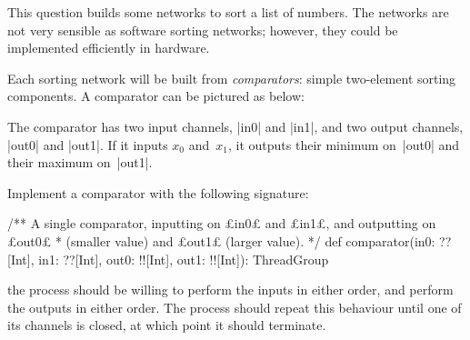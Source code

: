 \def\comp#1#2#3{%
  \draw (#1)+(#3,0) node {$\bullet$};
  \draw (#2)+(#3,0) node (n2) {$\bullet$};
  \draw[thick] (#1)+(#3,0) -- (n2.center);
}


\begin{question}
This question builds some networks to sort a list of numbers.  The networks
are not very sensible as software sorting networks; however, they could be
implemented efficiently in hardware. 

Each sorting network will be built from \emph{comparators}: simple
two-element sorting components.  A comparator can be pictured as below: 
%
\begin{center}
\end{center}
%
The comparator has two input channels, |in0| and |in1|, and two output
channels, |out0| and |out1|.  If it inputs $x_0$ and~$x_1$, it outputs their
minimum on~|out0| and their maximum on~|out1|.

\begin{qpart} 
Implement a comparator with the following signature:
%
\begin{scala}
  /** A single comparator, inputting on £in0£ and £in1£, and outputting on £out0£
    * (smaller value) and £out1£ (larger value). */
  def comparator(in0: ??[Int], in1: ??[Int], out0: !![Int], out1: !![Int]): ThreadGroup
\end{scala}
%
the process should be willing to perform the inputs in either order, and
perform the outputs in either order.  The process should repeat this behaviour
until one of its channels is closed, at which point it should terminate.
\end{qpart}



\end{question}
